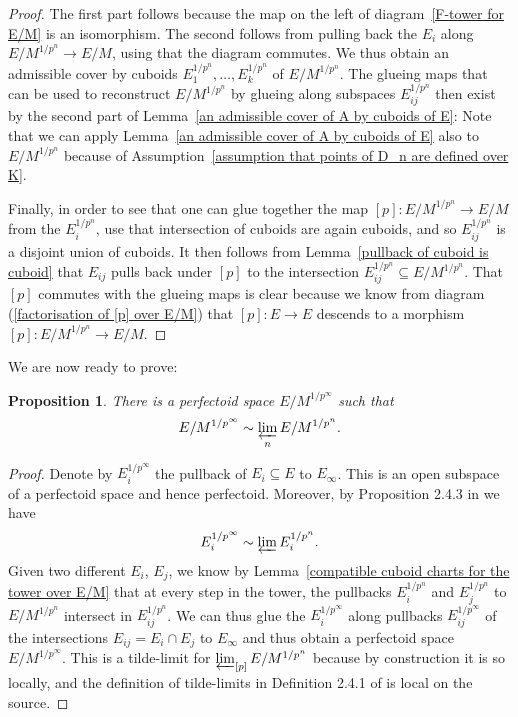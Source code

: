\documentclass[11pt,oneside]{amsart}
\newtheorem{proposition}[theorem]{Proposition}
\theoremstyle{definition}
\theoremstyle{remark}
\begin{document}
		\begin{proof}
		The first part follows because the map on the left of diagram~\ref{F-tower for E/M} is an isomorphism. The second follows from pulling back the $E_i$ along $E/M^{1/p^n}\rightarrow E/M$, using that the diagram commutes.	We thus obtain an admissible cover by cuboids $E_1^{1/p^n},\dots,E_k^{1/p^n}$ of $E/M^{1/p^n}$. The glueing maps that can be used to reconstruct $E/M^{1/p^n}$ by glueing along subspaces $E_{ij}^{1/p^n}$ then exist by the second part of Lemma~\ref{an admissible cover of A by cuboids of E}: Note that we can apply Lemma~\ref{an admissible cover of A by cuboids of E} also to $E/M^{1/p^n}$ because of Assumption~\ref{assumption that points of D_n are defined over K}.
		
		Finally, in order to see that one can glue together the map $[p]:E/M^{1/p^n}\rightarrow E/M$ from the $E_i^{1/p^n}$, use that intersection of cuboids are again cuboids, and so $E_{ij}^{1/p^n}$ is a disjoint union of cuboids. It then follows from Lemma~\ref{pullback of cuboid is cuboid} that $E_{ij}$ pulls back under $[p]$ to the intersection $E_{ij}^{1/p^n}\subseteq E/M^{1/p^n}$. That $[p]$ commutes with the glueing maps is clear because we know from diagram (\ref{factorisation of [p] over E/M}) that $[p]:E\rightarrow E$ descends to a morphism $[p]:E/M^{1/p^n}\rightarrow E/M$.
		\end{proof}
		We are now ready to prove:
		\begin{proposition}\label{explicit construction of vertical tilde-limit}
			There is a perfectoid space $E/M^{1/p^\infty}$ such that\[E/M^{1/p^\infty}\sim \varprojlim_{n}E/M^{1/p^n}. \]
		\end{proposition}
		\begin{proof}
		 Denote by $E_i^{1/p^\infty}$ the pullback of $E_i\subseteq E$ to $E_\infty$. This is an open subspace of a perfectoid space and hence perfectoid. Moreover, by Proposition 2.4.3 in \cite{SW} we have  \[ E_i^{1/p^\infty}\sim \varprojlim E_i^{1/p^n}.\] 
		Given two different $E_i$, $E_j$, we know by Lemma~\ref{compatible cuboid charts for the tower over E/M} that at every step in the tower, the pullbacks $E_i^{1/p^n}$ and $E_j^{1/p^n}$ to $E/M^{1/p^n}$ intersect in  $E_{ij}^{1/p^n}$.
		We can thus glue the $E_i^{1/p^\infty}$ along pullbacks $E_{ij}^{1/p^\infty}$ of the intersections $E_{ij}=E_i\cap E_j$ to $E_\infty$ and thus obtain a perfectoid space $E/M^{1/p^\infty}$. This is a tilde-limit for $\varprojlim_{[p]}E/M^{1/p^n}$ because by construction it is so locally, and the definition of tilde-limits in Definition 2.4.1 of \cite{SW} is local on the source.
		\end{proof}
	 
\end{document}
